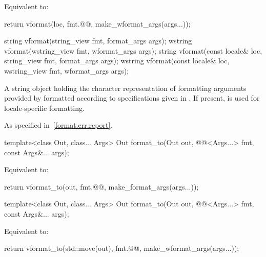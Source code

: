 \begin{itemdescr}
\pnum
\effects
Equivalent to:
\begin{codeblock}
return vformat(loc, fmt.@@, make_wformat_args(args...));
\end{codeblock}
\end{itemdescr}

%
\begin{itemdecl}
string vformat(string_view fmt, format_args args);
wstring vformat(wstring_view fmt, wformat_args args);
string vformat(const locale& loc, string_view fmt, format_args args);
wstring vformat(const locale& loc, wstring_view fmt, wformat_args args);
\end{itemdecl}

\begin{itemdescr}
\pnum
\returns
A string object holding the character representation of
formatting arguments provided by  formatted according to
specifications given in .
If present,  is used for locale-specific formatting.

\pnum
\throws
As specified in~\ref{format.err.report}.
\end{itemdescr}

%
\begin{itemdecl}
template<class Out, class... Args>
  Out format_to(Out out, @@<Args...> fmt, const Args&... args);
\end{itemdecl}

\begin{itemdescr}
\pnum
\effects
Equivalent to:
\begin{codeblock}
return vformat_to(out, fmt.@@, make_format_args(args...));
\end{codeblock}
\end{itemdescr}

%
\begin{itemdecl}
template<class Out, class... Args>
  Out format_to(Out out, @@<Args...> fmt, const Args&... args);
\end{itemdecl}

\begin{itemdescr}
\pnum
\effects
Equivalent to:
\begin{codeblock}
return vformat_to(std::move(out), fmt.@@, make_wformat_args(args...));
\end{codeblock}
\end{itemdescr}

